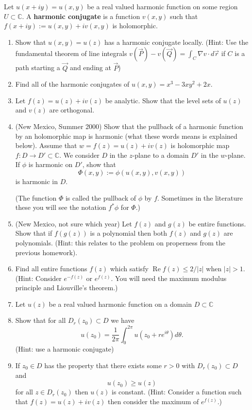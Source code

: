 \documentclass[a4paper,10pt]{article}
\newcommand{\CC}{\mathbb{C}}
\renewcommand{\Re}{\operatorname{Re}}
\begin{document}
Let $u(x+iy)=u(x,y)$ be a real valued harmonic function on some region $U \subset \CC$.
A \textbf{harmonic conjugate} is a function $v(x,y)$ such that $f(x+iy):= u(x,y) + i v(x,y)$ is holomorphic.

\begin{enumerate}
	\item  Show that $u(x,y) = u(z)$ has a harmonic conjugate locally. (Hint: Use the fundamental theorem of line integrals $v(\vec{P}) -v(\vec{Q})  = \int_{C} \nabla v \cdot d\vec{r}$ if $C$ is a path starting a $\vec{Q}$ and ending at $\vec{P}$)

	\item 
	Find all of the harmonic conjugates of $u(x,y) = x^3 - 3xy^2 + 2x$. 
	
	\item Let $f(z) = u(z) + i v(z)$ be analytic. 
	Show that the level sets of $u(z)$ and $v(z)$ are orthogonal.
	
	\item (New Mexico, Summer 2000)
	Show that the pullback of a harmonic function by an holomorphic map is harmonic (what these words means is explained below).
	Assume that $w = f(z) = u(z)+iv(z)$ is holomorphic map $f:D \to D' \subset \CC$. We consider $D$ in the $z$-plane to a domain $D'$ in the $w$-plane. 
	If $\phi$ is harmonic on $D'$, show that 
	$$ \Phi(x,y) := \phi(u(x,y),v(x,y))$$
	is harmonic in $D$. 
	
	(The function $\Phi$ is called the pullback of $\phi$ by $f$. Sometimes in the literature these you will see the notation $f^*\phi$ for $\Phi$.)
		
	\item (New Mexico, not sure which year) 
	Let $f(z)$ and $g(z)$ be entire functions. 
	Show that if $f(g(z))$ is a polynomial then both $f(z)$ and $g(z)$ are polynomials.
	(Hint: this relates to the problem on properness from the previous homework).
	
	\item Find all entire functions $f(z)$ which satisfy $\Re f(z) \leq 2/\vert z \vert$ when $\vert z \vert > 1$. (Hint: Consider $e^{-f(z)}$ or $e^{f(z)}$. You will need the maximum modulus principle and Liouville's theorem.)
	
	\item Let $u(z)$ be a real valued harmonic function on a domain $D \subset \CC$ 


		\item Show that for all $D_r(z_0) \subset D$ we have 
		$$ u(z_0) = \frac{1}{2\pi} \int_0^{2\pi} u(z_0+ r e^{i\theta}) d\theta. $$ (Hint: use a harmonic conjugate)
		\item If $z_0 \in D$ has the property that there exists some $r>0$ with $D_r(z_0) \subset D$ and 
		$$ u(z_0) \geq u(z) $$
		for all $z \in D_r(z_0)$ then $u(z)$ is constant. 
		(Hint: Consider a function such that $f(z) = u(z)+iv(z)$ then consider the maximum of $e^{f(z)}$.)
		

\end{enumerate}
\end{document}
